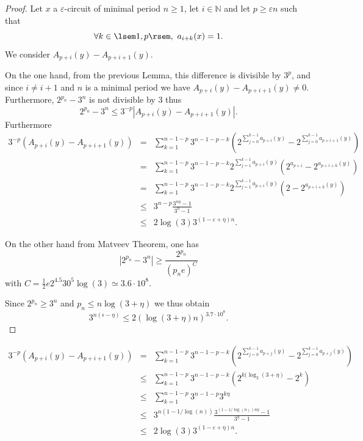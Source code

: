 \documentclass[12pt,a4paper]{article}
\def\NN{\mathbb{N}}
\begin{document}
\begin{proof}
Let $x$ a $\varepsilon$-circuit of minimal period $n\geq1$, let $i\in \NN$ and  let $p\geq \varepsilon n$ such that  
 $$\forall k \in \lsem
 1,p\rsem,~a_{i+k}(x)=1.$$
We consider $A_{p+i}(y)-A_{p+i+1}(y)$.

On the one hand, from the previous Lemma, this difference is divisible by $3^p$, and since $i\neq i+1$ and $n$ is a minimal period we have $A_{p+i}(y)-A_{p+i+1}(y)\neq 0$. 
Furthermore, $2^{p_n}-3^n$ is not divisible by $3$ thus 
$$2^{p_n}-3^n \leq 3^{-p}\left|A_{p+i}(y)-A_{p+i+1}(y)\right|.$$
Furthermore
\begin{eqnarray}
3^{-p}\left(A_{p+i}(y)-A_{p+i+1}(y)\right)&=& \sum_{k=1}^{n-1-p} 3^{n-1-p-k}\left( 2^{\sum_{j=0}^{k-1} a_{p+i}(y)}-2^{\sum_{j=0}^{k-1} a_{p+i+1}(y)} \right) \\
&=&\sum_{k=1}^{n-1-p} 3^{n-1-p-k} 2^{\sum_{j=1}^{k-1} a_{p+i}(y)}\left(2^{a_{p+i}}-2^{a_{p+i+k}(y)} \right) \\
&=&\sum_{k=1}^{n-1-p} 3^{n-1-p-k} 2^{\sum_{j=1}^{k-1} a_{p+i}(y)}\left(2-2^{a_{p+i+k}(y)} \right) \\
&\leq& 3^{n-p}\frac{3^{n\eta}-1}{3^\eta-1}\\
&\leq&  2\log(3)3^{(1-\varepsilon+\eta)n}.
\end{eqnarray} 

On the other hand from Matveev Theorem, one has  
$$\left| 2^{p_n}-3^{n}\right|\geq \frac{2^{p_n}}{(p_ne)^C}$$
with $C = \frac{1}{2}e2^{4.5}30^5\log(3) \simeq 3.6\cdot 10^{8}$.

Since $2^{p_n}\geq 3^n$ and $p_n\leq n\log(3+\eta)$ we thus obtain 
$$  3^{n(\epsilon-\eta)} \leq 2 \left(\log(3+\eta)n\right)^{3.7\cdot 10^8}.$$


\end{proof}



\begin{eqnarray}
3^{-p}\left(A_{p+i}(y)-A_{p+i+1}(y)\right)&=& \sum_{k=1}^{n-1-p} 3^{n-1-p-k}\left( 2^{\sum_{j=0}^{k-1} a_{p+j}(y)}-2^{\sum_{j=0}^{k-1} a_{p+j}(y)} \right) \\
&\leq&\sum_{k=1}^{n-1-p}3^{n-1-p-k}\left(2^{k(\log_2(3+\eta)}-2^{k}\right)\\
&\leq&\sum_{k=1}^{n-1-p}3^{n-1-p}3^{k\eta} \\
&\leq& 3^{n(1-1/\log(n))}\frac{3^{(1-1/\log(n))n\eta}-1}{3^\eta-1}\\
&\leq&  2\log(3)3^{(1-\varepsilon+\eta)n}.
\end{eqnarray} 
\end{document}
